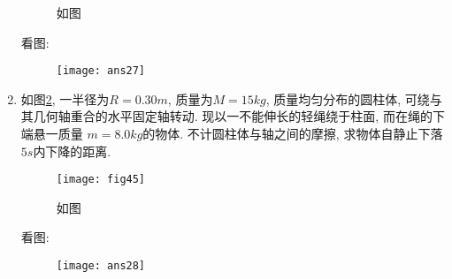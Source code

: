 \begin{enumerate}
\begin{figure}[H]
        \caption{如图}\label{Fig:44}
    \end{figure}
    \begin{solution}
        看图: 
        \begin{figure}[H]
            \centering
            \texttt{[image: ans27]}
        \end{figure}
    \end{solution}  
    \item 如图\ref{Fig:45}, 一半径为$R=0.30m$, 质量为$M=15kg$, 质量均匀分布的圆柱体, 可绕与其几何轴重合的水平固定轴转动. 现以一不能伸长的轻绳绕于柱面, 而在绳的下端悬一质量
    $m=8.0 kg$的物体. 不计圆柱体与轴之间的摩擦, 求物体自静止下落$5s$内下降的距离.
    \begin{figure}[H]
        \centering
        \texttt{[image: fig45]}
        \caption{如图}\label{Fig:45}
    \end{figure}
    \begin{solution}
        看图: 
        \begin{figure}[H]
            \centering
            \texttt{[image: ans28]}
        \end{figure}
    \end{solution}  
\end{enumerate}